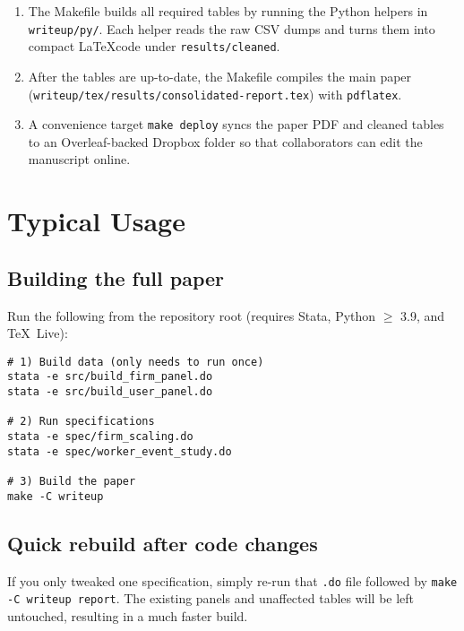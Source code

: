 \documentclass[11pt]{article}
\newcommand{\code}[1]{\texttt{#1}}
\begin{document}
\begin{enumerate}
  \item The Makefile builds all required tables by running the Python helpers
        in \code{writeup/py/}.  Each helper reads the raw CSV dumps and turns
        them into compact \LaTeX code under \code{results/cleaned}.
  \item After the tables are up-to-date, the Makefile compiles the main paper
        (\code{writeup/tex/results/consolidated-report.tex}) with \code{pdflatex}.
  \item A convenience target \code{make deploy} syncs the paper PDF and cleaned
        tables to an Overleaf-backed Dropbox folder so that collaborators can
        edit the manuscript online.
\end{enumerate}

\section{Typical Usage}

\subsection*{Building the full paper}

Run the following from the repository root (requires Stata, Python $\geq$ 3.9,
and \TeX\ Live):

\begin{verbatim}
# 1) Build data (only needs to run once)
stata -e src/build_firm_panel.do
stata -e src/build_user_panel.do

# 2) Run specifications
stata -e spec/firm_scaling.do
stata -e spec/worker_event_study.do

# 3) Build the paper
make -C writeup
\end{verbatim}

\subsection*{Quick rebuild after code changes}

If you only tweaked one specification, simply re-run that \code{.do} file
followed by \code{make -C writeup report}.  The existing panels and
unaffected tables will be left untouched, resulting in a much faster build.

\end{document}
